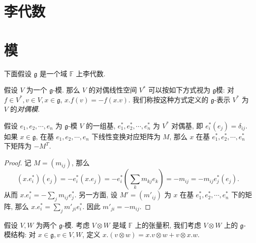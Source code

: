 \section{李代数}

\section{模}

下面假设 \( \mathfrak{g} \) 是一个域 \( \mathbb{F} \) 上李代数.

\begin{definition}[对偶模]
  假设 \( V \) 为一个 \( \mathfrak{g} \)-模. 那么 \( V \) 的对偶线性空间 \( V^*
  \) 可以按如下方式视为 \( \mathfrak{g} \)模: 对 \( f \in V^*, v \in V, x \in
  \mathfrak{g} \), \( x.f(v) = -f(x.v) \). 我们称按这种方式定义的 \(
  \mathfrak{g} \)-表示 \( V^* \) 为 \( V \) 的\emph{对偶模}.
\end{definition}

\begin{proposition}
  假设 \( e_1, e_2, \cdots, e_n \) 为 \( \mathfrak{g} \)-模 \( V \) 的一组基, \(
  e_1^*, e_2^*, \cdots, e_n^* \) 为 \( V^* \) 对偶基, 即 \( e_i^*(e_j) =
  \delta_{ij} \). 如果 \( x \in \mathfrak{g} \), 在基 \( e_1, e_2, \cdots, e_n
  \) 下线性变换对应矩阵为 \( M \), 那么 \( x \) 在基 \( e_1^*, e_2^*, \cdots,
  e_n^* \) 下矩阵为 \( -M^T \).
\end{proposition}
\begin{proof}
  记 \( M = \left(m_{ij}\right) \), 那么
  \[
    (x.e^*_i)(e_j) = -e^*_i(x.e_j) =
    -e_i^*(\sum_k m_{kj}e_k) = -m_{ij} = -m_{ij} e_j^*(e_j).
  \]
  从而 \( x.e^*_i = -\sum_{j}m_{ij}e^*_j \). 另一方面, 设 \( M' =
  \left(m'_{ij}\right) \) 为 \( x \) 在基 \( e^*_1, e^*_2, \cdots, e^*_n \)
  下的矩阵, 那么 \( x.e^*_i = \sum_j m'_{ji} e^*_i \). 因此 \( m'_{ji} = -m_{ij}
  \).
\end{proof}

\begin{definition}[张量模]
  假设 \( V, W \) 为两个 \( \mathfrak{g} \)-模. 考虑 \( V \otimes W \) 是域 \(
  \mathbb{F} \) 上的张量积, 我们考虑 \( V \otimes W \) 上的 \( \mathfrak{g}
  \)-模结构: 对 \( x \in \mathfrak{g}, v \in V, W \), 定义 \( x.(v \otimes w) =
  x.v \otimes w + v \otimes x.w \).
\end{definition}
